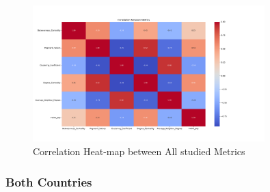 \begin{figure}[H]
     \centering
     \includegraphics[width=0.8\textwidth]{images/comparison/ALL/relationship_correlation_heatmap_ALL-2.png}
        \caption{Correlation Heat-map between All studied Metrics}
        \label{fig:heatmap}
\end{figure}

\subsubsection{Both Countries}



